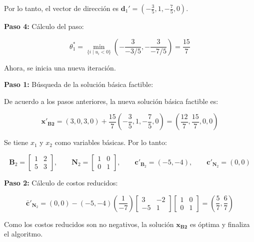 \begin{enumerate}
    Por lo tanto, el vector de dirección es
    $\mathbf{d}_1'= \left(-\frac{3}{5},1,-\frac{7}{5},0\right)$.

\textbf{Paso 4:} Cálculo del paso:

    \begin{equation}
        \theta^*_1
        =
        \min_{\{i \mid u_i < 0\}}
        \left( -\frac{3}{-3/5},
        -\frac{3}{-7/5}
        \right)
        =
        \frac{15}{7}
    \end{equation}

    Ahora, se inicia una nueva iteración.

\textbf{Paso 1:} Búsqueda de la solución básica factible:

    De acuerdo a los pasos anteriores, la nueva solución básica factible es:

    \begin{equation}
        \mathbf{x}'_{\mathbf{B2}}
        =
        (3,0,3,0)
        +
        \frac{15}{7}
        \left(
        -\frac{3}{5},
        1,
        -\frac{7}{5},
        0
        \right)
        =
        \left(
        \frac{12}{7},
        \frac{15}{7},
        0,
        0
        \right)
    \end{equation}

    Se tiene $x_1$ y $x_2$ como variables básicas. Por lo tanto:

    \begin{equation}
        \mathbf{B}_2
        =
        \begin{bmatrix}
            1 & 2 \\
            5 & 3
        \end{bmatrix},
        \qquad
        \mathbf{N}_2
        =
        \begin{bmatrix}
            1 & 0 \\
            0 & 1
        \end{bmatrix},
        \qquad
        \mathbf{c}'_{\mathbf{B}_2} = (-5,-4),
        \qquad
        \mathbf{c}'_{\mathbf{N}_2} = (0,0)
    \end{equation}

\textbf{Paso 2:} Cálculo de costos reducidos:

    \begin{equation}
        \bar{\mathbf{c}}'_{\mathbf{N}_2}
        =
        (0,0)
        -
        (-5,-4)
        \left(
        \frac{1}{-7}
        \right)
        \begin{bmatrix}
            3 & -2 \\
            -5 & 1
        \end{bmatrix}
        \begin{bmatrix}
            1 & 0 \\
            0 & 1
        \end{bmatrix}
        =
        \left(
        \frac{5}{7},
        \frac{6}{7}
        \right)
    \end{equation}

    Como los costos reducidos son no negativos, la solución $\mathbf{x}_{\mathbf{B2}}$ es óptima y finaliza el algoritmo.

\end{enumerate}
